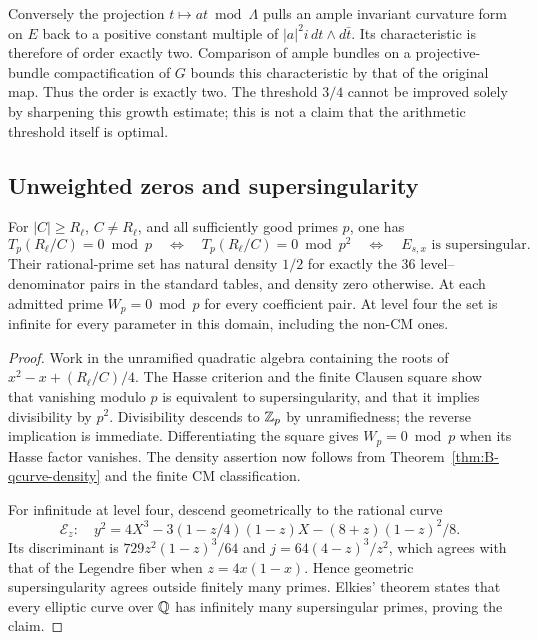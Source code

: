 Conversely the projection $t\mapsto at\bmod\Lambda$ pulls an
ample invariant curvature form on $E$ back to a positive constant
multiple of $|a|^2i\,dt\wedge d\bar t$.  Its characteristic is
therefore of order exactly two.  Comparison of ample bundles on
a projective-bundle compactification of $G$ bounds this
characteristic by that of the original map.  Thus the order is
exactly two.  The threshold $3/4$ cannot be improved solely by
sharpening this growth estimate; this is not a claim that the
arithmetic threshold itself is optimal.

\subsection{Unweighted zeros and supersingularity}
\label{rev:unweighted-tests}
\begin{proposition}
\label{prop:levels123-density}\label{prop:density}
\label{prop:infinite-congruences}
For $|C|\ge R_\ell$, $C\ne R_\ell$, and all sufficiently good
primes $p$, one has
\[
 T_p(R_\ell/C)=0\bmod p
 \quad\Longleftrightarrow\quad T_p(R_\ell/C)=0\bmod p^2
 \quad\Longleftrightarrow\quad E_{s,x}\text{ is supersingular}.
\]
Their rational-prime set has natural density $1/2$ for exactly
the 36 level--denominator pairs in the standard tables, and
density zero otherwise.  At each admitted prime $W_p=0\bmod p$
for every coefficient pair.  At level four the set is infinite
for every parameter in this domain, including the non-CM ones.
\end{proposition}
\begin{proof}
Work in the unramified quadratic algebra containing the roots
of $x^2-x+(R_\ell/C)/4$.  The Hasse criterion and the finite
Clausen square show that vanishing modulo $p$ is equivalent to
supersingularity, and that it implies divisibility by $p^2$.
Divisibility descends to $\mathbb Z_p$ by unramifiedness; the reverse
implication is immediate.  Differentiating the square gives
$W_p=0\bmod p$ when its Hasse factor vanishes.  The density
assertion now follows from Theorem~\ref{thm:B-qcurve-density}
and the finite CM classification.

For infinitude at level four, descend geometrically to the
rational curve
\begin{equation}\label{lem:rational-descent}
 \mathcal E_z:\quad y^2=4X^3-3(1-z/4)(1-z)X
                                      -(8+z)(1-z)^2/8.
\end{equation}
Its discriminant is $729z^2(1-z)^3/64$ and
$j=64(4-z)^3/z^2$, which agrees with that of the Legendre fiber
when $z=4x(1-x)$.  Hence geometric supersingularity agrees
outside finitely many primes.  Elkies' theorem \cite{Elkies}
states that every elliptic curve over $\mathbb Q$ has infinitely many
supersingular primes, proving the claim.
\end{proof}

